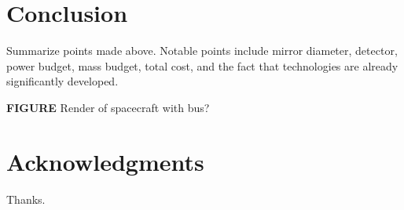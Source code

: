 \documentclass{ws-jai}
\begin{document}
%
%
%
%
%

\section{Conclusion}
\label{S:conclusion}
Summarize points made above. Notable points include mirror diameter, detector, power budget, mass budget, total cost, and the fact that technologies are already significantly developed.

\textbf{FIGURE} Render of spacecraft with bus?

\section*{Acknowledgments}
Thanks.


\end{document}

